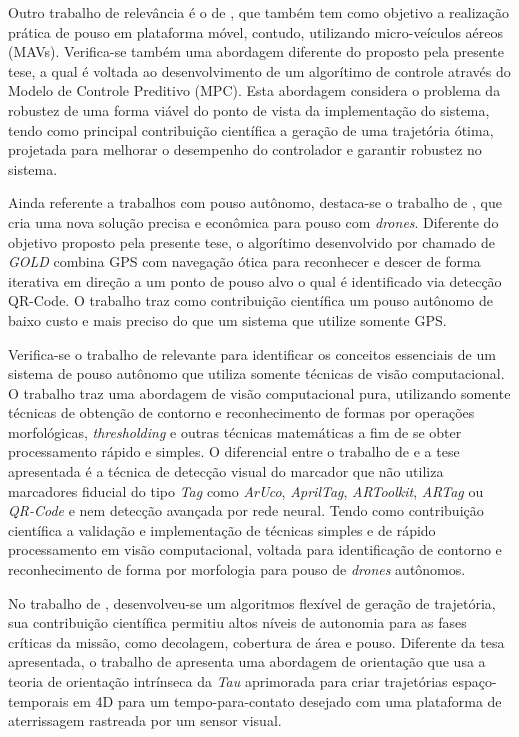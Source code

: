     Outro trabalho de relevância é o de \citet{Gilberto2016}, que também tem como objetivo a realização prática de pouso em plataforma móvel, contudo, utilizando micro-veículos aéreos (MAVs). Verifica-se também uma abordagem diferente do proposto pela presente tese, a qual é voltada ao desenvolvimento de um algorítimo de controle através do Modelo de Controle Preditivo (MPC). Esta abordagem considera o problema da robustez de uma forma viável do ponto de vista da implementação do sistema, tendo como principal contribuição científica a geração de uma trajetória ótima, projetada para melhorar o desempenho do controlador e garantir robustez no sistema.
    
    Ainda referente a trabalhos com pouso autônomo, destaca-se o trabalho de \citet{Maiman2017}, que cria uma nova solução precisa e econômica para pouso com \textit{drones}. Diferente do objetivo proposto pela presente tese, o algorítimo desenvolvido por \citet{Maiman2017} chamado de \textit{GOLD} combina GPS com navegação ótica para reconhecer e descer de forma iterativa em direção a um ponto de pouso alvo o qual é identificado via detecção QR-Code. O trabalho traz como contribuição científica um pouso autônomo de baixo custo e mais preciso do que um sistema que utilize somente GPS.
    
    Verifica-se o trabalho de \citet{Vidal2016} relevante para identificar os conceitos essenciais de um sistema de pouso autônomo que utiliza somente técnicas de visão computacional. O trabalho traz uma abordagem de visão computacional pura, utilizando somente técnicas de obtenção de contorno e reconhecimento de formas por operações morfológicas, \textit{thresholding} e outras técnicas matemáticas a fim de se obter processamento rápido e simples. O diferencial entre o trabalho de \citet{Vidal2016} e a tese apresentada é a técnica de detecção visual do marcador que não utiliza marcadores fiducial do tipo \textit{Tag} como \textit{ArUco}, \textit{AprilTag}, \textit{ARToolkit}, \textit{ARTag} ou \textit{QR-Code} e nem detecção avançada por rede neural. Tendo como contribuição científica a validação e implementação de técnicas simples e de rápido processamento em visão computacional, voltada para identificação de contorno e reconhecimento de forma por morfologia para pouso de \textit{drones} autônomos.
    
    No trabalho de \citet{Vetrella2017}, desenvolveu-se um algoritmos flexível de geração de trajetória, sua contribuição científica permitiu altos níveis de autonomia para as fases críticas da missão, como decolagem, cobertura de área e pouso. Diferente da tesa apresentada, o trabalho de \citet{Vetrella2017} apresenta uma abordagem de orientação que usa a teoria de orientação intrínseca da \textit{Tau} aprimorada para criar trajetórias espaço-temporais em 4D para um tempo-para-contato desejado com uma plataforma de aterrissagem rastreada por um sensor visual.
    
